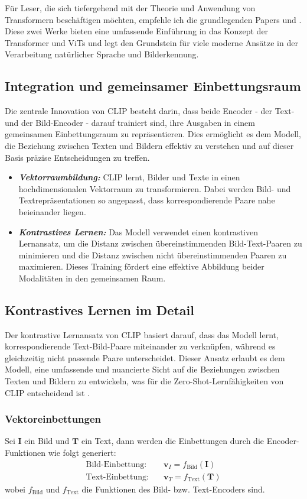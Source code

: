 \documentclass[nolibertine, ngerman, algorithm, nomencl, minted]{ttlab-qualify}
\begin{document}
Für Leser, die sich tiefergehend mit der Theorie und Anwendung von Transformern beschäftigen möchten, 
empfehle ich die grundlegenden Papers \textcite{vaswani2017attention} und \textcite{dosovitskiy2020image}.
Diese zwei Werke bieten eine umfassende Einführung in das Konzept der Transformer und ViTs und legt 
den Grundstein für viele moderne Ansätze in der Verarbeitung natürlicher Sprache und Bilderkennung.

\subsection{Integration und gemeinsamer Einbettungsraum}
Die zentrale Innovation von CLIP besteht darin, dass beide Encoder - der Text- und der Bild-Encoder - darauf trainiert sind, ihre Ausgaben in einem gemeinsamen Einbettungsraum zu repräsentieren. Dies ermöglicht es dem Modell, die Beziehung zwischen Texten und Bildern effektiv zu verstehen und auf dieser Basis präzise Entscheidungen zu treffen.

\begin{itemize}
	\item \textbf{\textit{Vektorraumbildung: }} CLIP lernt, Bilder und Texte in einen hochdimensionalen Vektorraum zu transformieren. Dabei werden Bild- und Textrepräsentationen so angepasst, dass korrespondierende Paare nahe beieinander liegen.
	\item \textbf{\textit{Kontrastives Lernen: }}Das Modell verwendet einen kontrastiven Lernansatz, um die Distanz zwischen übereinstimmenden Bild-Text-Paaren zu minimieren und die Distanz zwischen nicht übereinstimmenden Paaren zu maximieren. Dieses Training fördert eine effektive Abbildung beider Modalitäten in den gemeinsamen Raum.
\end{itemize}

\subsection{Kontrastives Lernen im Detail}
Der kontrastive Lernansatz von CLIP basiert darauf, dass das Modell
lernt, korrespondierende Text-Bild-Paare miteinander zu verknüpfen,
während es gleichzeitig nicht passende Paare unterscheidet. Dieser
Ansatz erlaubt es dem Modell, eine umfassende und nuancierte Sicht
auf die Beziehungen zwischen Texten und Bildern zu entwickeln, was für die 
Zero-Shot-Lernfähigkeiten von CLIP entscheidend ist \parencite[5]{radford2021learning}.


\subsubsection{Vektoreinbettungen}
Sei \( \textbf{I} \) ein Bild und \( \textbf{T} \) ein Text, dann werden die Einbettungen durch die Encoder-Funktionen wie folgt generiert:
\begin{align*}
\text{Bild-Einbettung:} \quad & \textbf{v}_I = f_{\text{Bild}}(\textbf{I}) \\
\text{Text-Einbettung:} \quad & \textbf{v}_T = f_{\text{Text}}(\textbf{T})
\end{align*}
wobei \( f_{\text{Bild}} \) und \( f_{\text{Text}} \) die Funktionen des Bild- bzw. Text-Encoders sind.
\end{document}
